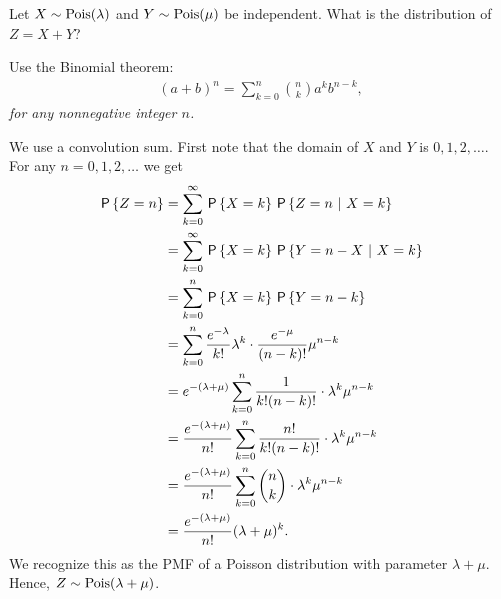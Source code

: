 \begin{exercise}
Let $X \sim \Pois{\lambda}$ and $Y \sim \Pois{\mu}$ be independent. What is the distribution of $Z = X + Y$?\\
\begin{hint}
Use the Binomial theorem:
\begin{align}
    (a + b)^n = \sum_{k=0}^n {n \choose k}a^k b^{n-k},
\end{align}
\textit{for any nonnegative integer $n$.}
\end{hint}

\begin{solution}
We use a convolution sum. First note that the domain of $X$ and $Y$ is $0,1,2,\ldots$. For any $n=0,1,2,\ldots$ we get
\begin{align}
    \P{Z = n} &= \sum_{k=0}^\infty \P{X = k} \P{Z = n \ | \ X = k} \\
    &= \sum_{k=0}^\infty \P{X = k} \P{Y = n - X \ | \ X = k} \\
    &= \sum_{k=0}^n \P{X = k} \P{Y = n - k} \\
    &= \sum_{k=0}^n \frac{e^{-\lambda}}{k!}\lambda^k  \cdot \frac{e^{-\mu}}{(n-k)!}\mu^{n-k}  \\
    &= e^{-(\lambda+\mu)} \sum_{k=0}^n \frac{1}{k!(n-k)!} \cdot \lambda^k\mu^{n-k}  \\
    &= \frac{e^{-(\lambda+\mu)}}{n!} \sum_{k=0}^n \frac{n!}{k!(n-k)!} \cdot \lambda^k\mu^{n-k}  \\
    &= \frac{e^{-(\lambda+\mu)}}{n!} \sum_{k=0}^n {n \choose k} \cdot \lambda^k\mu^{n-k}  \\
    &= \frac{e^{-(\lambda+\mu)}}{n!} (\lambda + \mu)^k.
\end{align}
We recognize this as the PMF of a Poisson distribution with parameter $\lambda+\mu$. Hence, $Z \sim \Pois{\lambda + \mu}$.
\end{solution}
\end{exercise}

